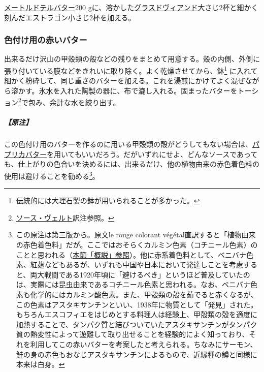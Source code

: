 \begin{recette}


\protect\hyperlink{beurre-maitre-d-hotel}{メートルドテルバター}200
gに、溶かした\protect\hyperlink{glace-de-viande}{グラスドヴィアンド}大さじ2杯と細かく刻んだエストラゴン小さじ2杯を加える。

\hypertarget{beurre-colorant-rouge}{%
\subsubsection{色付け用の赤いバター}\label{beurre-colorant-rouge}}



出来るだけ沢山の甲殻類の殻などの残りをまとめて用意する。殻の内側、外側に張り付いている膜などをきれいに取り除く。よく乾燥させてから、鉢\footnote{伝統的には大理石製の鉢が用いられることが多かった。}
に入れて細かく粉砕して、同じ重さのバターを加える。これを湯煎にかけてよく混ぜながら溶かす。氷水を入れた陶製の器に、布で漉し入れる。固まったバターをトーション\footnote{\protect\hyperlink{sauce-verte}{ソース・ヴェルト}訳注参照。}で包み、余計な水を絞り出す。

\hypertarget{nota-beurre-colorant-rouge}{%
\subparagraph{【原注】}\label{nota-beurre-colorant-rouge}}

この色付け用のバターを作るのに用いる甲殻類の殻がどうしてもない場合は、\protect\hyperlink{beurre-de-paprika}{パプリカバター}を用いてもいいだろう。だがいずれにせよ、どんなソースであっても、仕上がりの色合いを決めるには、出来るだけ、他の植物由来の赤色着色料の使用は避けることを勧める\footnote{この原注は第三版から。原文le
  rouge colorant
  végétal直訳すると「植物由来の赤色着色料」だが。ここではおそらくカルミン色素（コチニール色素）のことと思われる（\protect\hyperlink{observation-sur-les-beurres-composes}{本節「概説」参照}）。他に赤系着色料として、ベニバナ色素、紅麹などもあるが、いずれも中国や日本において発達しことを考慮すると、両大戦間である1920年頃に「避けるべき」というほど普及していたのは、実際には昆虫由来であるコチニール色素と思われる。なお、ベニバナ色素も化学的にはカルミン酸色素。また、甲殻類の殻を茹でると赤くなるが、この色素はアスタキサンチンといい、1938年に物質として「発見」された。もちろんエスコフィエをはじめとする料理人は経験上、甲殻類の殻を適度に加熱することで、タンパク質と結びついていたアスタキサンチンがタンパク質の熱変性によって遊離して取り出せることを経験的によく知っており、それを利用してこの赤いバターを考案したと考えられる。ちなみにサーモン、鮭の身の赤色もおなじアスタキサンチンによるもので、近縁種の鱒と同様に本来は白身。}。


\end{recette}
